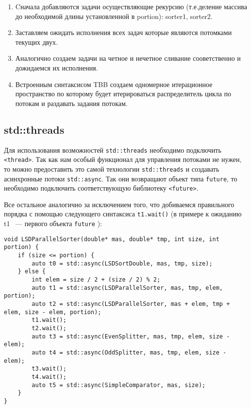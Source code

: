 \documentclass{article}
\begin{document}
\begin{enumerate}
\item Cначала добавляются задачи осуществляющие рекурсию (т.е.деление массива до необходимой длины установленной в portion): sorter1, sorter2.

\item Заставляем ожидать исполнения всех задач которые являются потомками текущих двух.
\item Аналогично создаем задачи на четное и нечетное сливание сооветственно и дожидаемся их исполнения.
\item Встроенным синтаксисом TBB создаем одномерное итерационное пространство по которому будет итерироваться распределитель цикла по потокам и раздавать задания потокам.
\end{enumerate}

\subsection{std::threads}

\par Для использования возможностей \verb|std::threads| необходимо подключить \verb|<thread>|. Так как нам особый функционал для управления потоками не нужен, то можно предоставить это самой технологии \verb|std::threads| и создавать асинхронные потоки  \verb|std::async|. Так они возвращают объект типа \verb|future|, то необходимо подключить соответствующую библиотеку \verb|<future>|.

\par Все остальное аналогично за исключением того, что добиваемся правильного порядка с помощью следующего синтаксиса \verb|t1.wait()| (в примере к ожиданию t1 ~--- первого объекта \verb|future| ):
\vspace{10pt}
\begin{lstlisting}
void LSDParallelSorter(double* mas, double* tmp, int size, int portion) {
    if (size <= portion) {
        auto t0 = std::async(LSDSortDouble, mas, tmp, size);
    } else {
        int elem = size / 2 + (size / 2) % 2;
        auto t1 = std::async(LSDParallelSorter, mas, tmp, elem, portion);
        auto t2 = std::async(LSDParallelSorter, mas + elem, tmp + elem, size - elem, portion);
        t1.wait();
        t2.wait();
        auto t3 = std::async(EvenSplitter, mas, tmp, elem, size - elem);
        auto t4 = std::async(OddSplitter, mas, tmp, elem, size - elem);
        t3.wait();
        t4.wait();
        auto t5 = std::async(SimpleComparator, mas, size);
    }
}
\end{lstlisting}
\vspace{-25pt}
\end{document}
